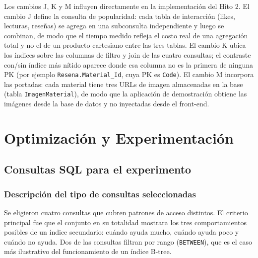 \documentclass[12pt,a4paper]{article}
\begin{document}
Los cambios J, K y M influyen directamente en la implementación del Hito 2.
El cambio J define la consulta de popularidad: cada tabla de interacción
(likes, lecturas, reseñas) se agrega en una subconsulta independiente y luego
se combinan, de modo que el tiempo medido refleja el costo real de una
agregación total y no el de un producto cartesiano entre las tres tablas.
El cambio K ubica los índices sobre las columnas de filtro y join de las cuatro
consultas; el contraste con/sin índice más nítido aparece donde esa columna no
es la primera de ninguna PK (por ejemplo \texttt{Resena.Material\_Id}, cuya PK
es \texttt{Code}). El cambio M incorpora las portadas: cada material tiene tres
URLs de imagen almacenadas en la base (tabla \texttt{ImagenMaterial}), de modo
que la aplicación de demostración obtiene las imágenes desde la base de datos y
no inyectadas desde el front-end.


\section{Optimización y Experimentación}

\subsection{Consultas SQL para el experimento}

\subsubsection{Descripción del tipo de consultas seleccionadas}

Se eligieron cuatro consultas que cubren patrones de acceso distintos. El
criterio principal fue que el conjunto en su totalidad mostrara los tres
comportamientos posibles de un índice secundario: cuándo ayuda mucho,
cuándo ayuda poco y cuándo no ayuda. Dos de las consultas filtran por rango
(\texttt{BETWEEN}), que es el caso más ilustrativo del funcionamiento de
un índice B-tree.
\end{document}
